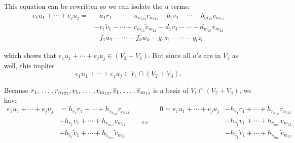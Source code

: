\begin{xrcs}
  This equation can be rewritten so we can isolate the $u$ terms:
  \[
  \begin{aligned}
    e_{1} u_1 + \cdots + e_j u_j = &- a_1r_1 -  \cdots - a_{n_{123}} r_{n_{123}} - b_1v_1 -  \cdots - b_{m_{12}} v_{m_{12}} \\
    &-  c_1\widetilde{v}_1 - \cdots - c_{m_{13}}\widetilde{v}_{m_{13}} - d_{1}\overline{v}_1 - \cdots - d_{m_{23}}\overline{v}_{m_{23}} \\
    &  - f_1 w_1 - \cdots - f_k w_k - g_1 z_1 - \cdots - g_l z_l
  \end{aligned}
  \]

  which shows that $e_{1} u_1 + \cdots + e_j u_j \in (V_2 + V_3)$. But since all $u$'s are in $V_1$ as well, this implies
  \[ e_{1} u_1 + \cdots + e_j u_j \in V_1 \cap (V_2 + V_3).\]


  Because $r_{1}, {\, \ldots \,\,}, r_{n_{123}}, v_{1}, {\, \ldots \,\,}, v_{m_{12}}, \widetilde{v}_1, {\, \ldots \,\,}, \widetilde{v}_{m_{13}}$ is a basis of $V_1 \cap (V_2+V_3)$, we have
  \begin{equation}
    \label{eq: equation for u}
    \begin{aligned}
    e_{1} u_1 + \cdots + e_j u_j &= h_{r_{1}} r_{1} + \cdots + h_{r_{n_{123}}} r_{n_{123}} \\
    &  + h_{v_{1}} v_{1} + \cdots + h_{v_{m_{12}}} v_{m_{12}} \\
    &  + h_{\widetilde{v}_1} \widetilde{v}_1 + \cdots + h_{\widetilde{v}_{m_{13}}} \widetilde{v}_{m_{13}}
    \end{aligned}
    \quad \iff \quad
    \begin{aligned}
    0 = e_{1} u_1 + \cdots + e_j u_j &- h_{r_{1}} r_{1} + \cdots + h_{r_{n_{123}}} r_{n_{123}} \\
    &  - h_{v_{1}} v_{1} + \cdots + h_{v_{m_{12}}} v_{m_{12}} \\
    &  - h_{\widetilde{v}_1} \widetilde{v}_1 + \cdots + h_{\widetilde{v}_{m_{13}}} \widetilde{v}_{m_{13}}
    \end{aligned}
  \end{equation}


\end{xrcs}

